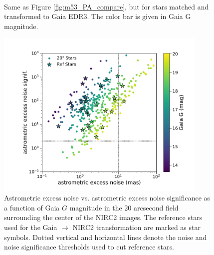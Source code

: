 \documentclass[]{spie}  %
\begin{document}
\begin{figure}[!h]
  \centering
  \\
  \hspace{-1cm}
  \caption{Same as Figure \ref{fig:m53_PA_compare}, but for stars matched and transformed to Gaia EDR3. The color bar is given in Gaia G magnitude.} \label{fig:m53_PA_compare_gaia}
\end{figure}

\begin{figure}[!htb]
 \centering
 \includegraphics[width=0.9\textwidth]{airopa/Figures/m53_aen.pdf}
 \caption{\footnotesize Astrometric excess noise vs. astrometric excess noise significance as a function of Gaia $G$ magnitude in the 20 arcsecond field surrounding the center of the NIRC2 images. The reference stars used for the Gaia $\rightarrow$ NIRC2 transformation are marked as star symbols. Dotted vertical and horizontal lines denote the noise and noise significance thresholds used to cut reference stars.\label{fig:m53_aen}}
\end{figure}
\end{document}
